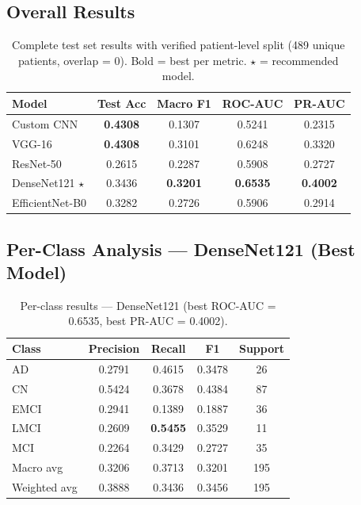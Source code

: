 \documentclass[12pt, a4paper]{article}
\begin{document}
\subsection{Overall Results}

\begin{table}[H]
\centering
\caption{Complete test set results with verified patient-level
split (489 unique patients, overlap = 0).
Bold = best per metric. $\star$ = recommended model.}
\label{tab:results}
\begin{tabular}{lcccc}
\toprule
\textbf{Model} & \textbf{Test Acc} & \textbf{Macro F1}
    & \textbf{ROC-AUC} & \textbf{PR-AUC}\\
\midrule
Custom CNN          & \textbf{0.4308} & 0.1307
    & 0.5241 & 0.2315\\
VGG-16              & \textbf{0.4308} & 0.3101
    & 0.6248 & 0.3320\\
ResNet-50           & 0.2615 & 0.2287
    & 0.5908 & 0.2727\\
DenseNet121 $\star$ & 0.3436 & \textbf{0.3201}
    & \textbf{0.6535} & \textbf{0.4002}\\
EfficientNet-B0     & 0.3282 & 0.2726
    & 0.5906 & 0.2914\\
\bottomrule
\end{tabular}
\end{table}

\subsection{Per-Class Analysis --- DenseNet121 (Best Model)}

\begin{table}[H]
\centering
\caption{Per-class results --- DenseNet121
(best ROC-AUC = 0.6535, best PR-AUC = 0.4002).}
\label{tab:dense}
\begin{tabular}{lcccc}
\toprule
\textbf{Class} & \textbf{Precision} & \textbf{Recall}
    & \textbf{F1} & \textbf{Support}\\
\midrule
AD   & 0.2791 & 0.4615 & 0.3478 & 26\\
CN   & 0.5424 & 0.3678 & 0.4384 & 87\\
EMCI & 0.2941 & 0.1389 & 0.1887 & 36\\
LMCI & 0.2609 & \textbf{0.5455} & 0.3529 & 11\\
MCI  & 0.2264 & 0.3429 & 0.2727 & 35\\
\midrule
Macro avg    & 0.3206 & 0.3713 & 0.3201 & 195\\
Weighted avg & 0.3888 & 0.3436 & 0.3456 & 195\\
\bottomrule
\end{tabular}
\end{table}
\end{document}
